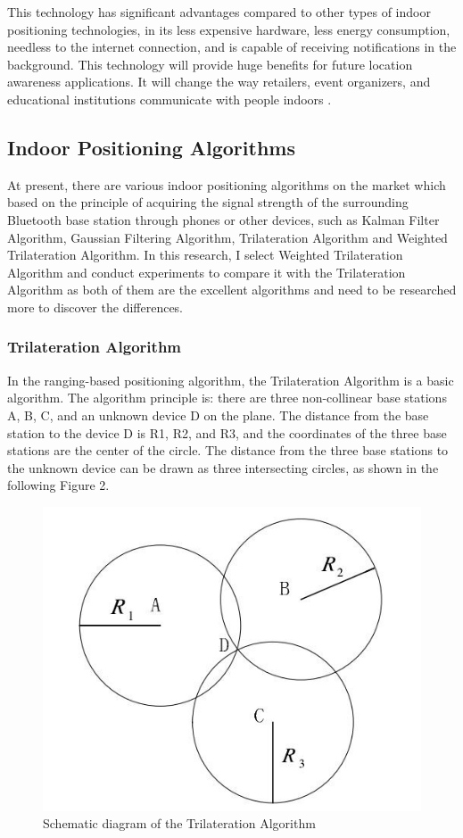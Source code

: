 \documentclass{sigchi}
\begin{document}
This technology has significant advantages compared to other types of indoor positioning technologies, in its less expensive hardware, less energy consumption, needless to the internet connection, and is capable of receiving notifications in the background. This technology will provide huge benefits for future location awareness applications. It will change the way retailers, event organizers, and educational institutions communicate with people indoors \cite{fard2015indoor}. 

\subsection{Indoor Positioning Algorithms}

At present, there are various indoor positioning algorithms on the market which based on the principle of acquiring the signal strength of the surrounding Bluetooth base station through phones or other devices, such as Kalman Filter Algorithm, Gaussian Filtering Algorithm, Trilateration Algorithm and Weighted Trilateration Algorithm. In this research, I select Weighted Trilateration Algorithm and conduct experiments to compare it with the Trilateration Algorithm as both of them are the excellent algorithms and need to be researched more to discover the differences.

\subsubsection{Trilateration Algorithm}

In the ranging-based positioning algorithm, the Trilateration Algorithm \cite{liu2018trilateration} is a basic algorithm. The algorithm principle is: there are three non-collinear base stations A, B, C, and an unknown device D on the plane. The distance from the base station to the device D is R1, R2, and R3, and the coordinates of the three base stations are the center of the circle. The distance from the three base stations to the unknown device can be drawn as three intersecting circles, as shown in the following Figure 2.

\begin{figure}[h]
\centering
\includegraphics[width=0.7\columnwidth]{1}
\caption{Schematic diagram of the Trilateration Algorithm}
\label{fig:universe}
\end{figure}
\end{document}

